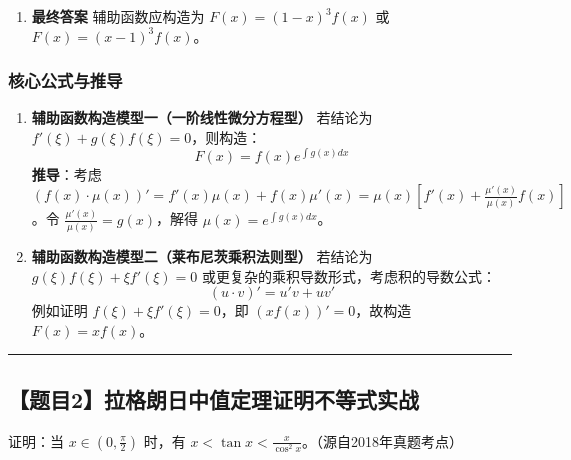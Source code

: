 \documentclass[UTF8]{ctexart}
\newenvironment{redenv}{\color{red}}{}
\newenvironment{detailedanalysis}{%
    \color{red}
    \begin{enumerate}[label=\textbf{第\arabic*步：}, leftmargin=*, align=left, itemsep=1.5ex]
}{%
    \end{enumerate}
}
\newenvironment{formuladerivation}{%
    \begin{enumerate}[label={\textbf{公式\arabic*：}}, leftmargin=*, align=left]
}{%
    \end{enumerate}
}
\newcommand{\problemrule}{\noindent\rule{\textwidth}{1.5pt}\vspace{-0.8em}}
\begin{document}
\begin{redenv}
\begin{detailedanalysis}
\item \textbf{最终答案}
辅助函数应构造为 $F(x) = (1-x)^3 f(x)$ 或 $F(x) = (x-1)^3 f(x)$。
\end{detailedanalysis}

\subsubsection*{核心公式与推导}

\begin{formuladerivation}
\item \textbf{辅助函数构造模型一（一阶线性微分方程型）}
若结论为 $f'(\xi) + g(\xi)f(\xi) = 0$，则构造：
\[ F(x) = f(x) e^{\int g(x) dx} \]
\textbf{推导}：考虑 $(f(x) \cdot \mu(x))' = f'(x)\mu(x) + f(x)\mu'(x) = \mu(x)[f'(x) + \frac{\mu'(x)}{\mu(x)}f(x)]$。令 $\frac{\mu'(x)}{\mu(x)} = g(x)$，解得 $\mu(x) = e^{\int g(x) dx}$。

\item \textbf{辅助函数构造模型二（莱布尼茨乘积法则型）}
若结论为 $g(\xi)f(\xi) + \xi f'(\xi) = 0$ 或更复杂的乘积导数形式，考虑积的导数公式：
\[ (u \cdot v)' = u'v + uv' \]
例如证明 $f(\xi) + \xi f'(\xi) = 0$，即 $(x f(x))' = 0$，故构造 $F(x) = x f(x)$。
\end{formuladerivation}
\end{redenv}

\vspace{2em}
\problemrule
\subsection*{【题目2】拉格朗日中值定理证明不等式实战}
证明：当 $x \in (0, \frac{\pi}{2})$ 时，有 $x < \tan x < \frac{x}{\cos^2 x}$。（源自2018年真题考点）
\end{document}
